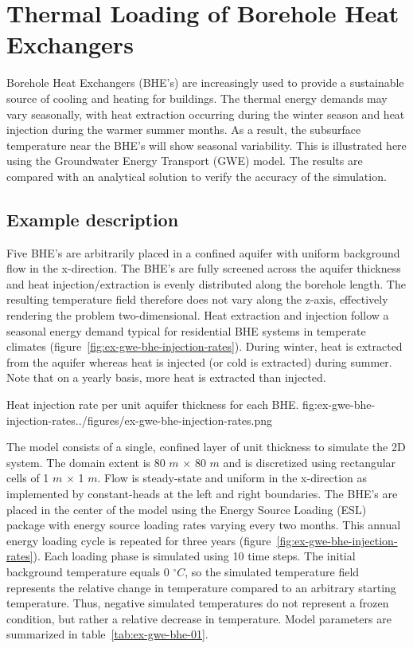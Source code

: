 \section{Thermal Loading of Borehole Heat Exchangers}

Borehole Heat Exchangers (BHE's) are increasingly used to provide a sustainable source of cooling and heating for buildings. The thermal energy demands may vary seasonally, with heat extraction occurring during the winter season and heat injection during the warmer summer months. As a result, the subsurface temperature near the BHE's will show seasonal variability. This is illustrated here using the Groundwater Energy Transport (GWE) model. The results are compared with an analytical solution to verify the accuracy of the \mf simulation. 

\subsection{Example description}

Five BHE's are arbitrarily placed in a confined aquifer with uniform background flow in the x-direction. The BHE's are fully screened across the aquifer thickness and heat injection/extraction is evenly distributed along the borehole length. The resulting temperature field therefore does not vary along the z-axis, effectively rendering the problem two-dimensional. Heat extraction and injection follow a seasonal energy demand typical for residential BHE systems in temperate climates (figure~\ref{fig:ex-gwe-bhe-injection-rates}). During winter, heat is extracted from the aquifer whereas heat is injected (or cold is extracted) during summer. Note that on a yearly basis, more heat is extracted than injected.

\begin{StandardFigure}{
    Heat injection rate per unit aquifer thickness for each BHE.
    }{fig:ex-gwe-bhe-injection-rates}{../figures/ex-gwe-bhe-injection-rates.png}
\end{StandardFigure}                                 

The \mf model consists of a single, confined layer of unit thickness to simulate the 2D system. The domain extent is 80 $m$ $\times$ 80 $m$ and is discretized using rectangular cells of 1 $m$ $\times$ 1 $m$. Flow is steady-state and uniform in the x-direction as implemented by constant-heads at the left and right boundaries. The BHE's are placed in the center of the model using the Energy Source Loading (ESL) package with energy source loading rates varying every two months. This annual energy loading cycle is repeated for three years (figure~\ref{fig:ex-gwe-bhe-injection-rates}). Each loading phase is simulated using 10 time steps. The initial background temperature equals 0 $^{\circ} C$, so the simulated temperature field represents the relative change in temperature compared to an arbitrary starting temperature. Thus, negative simulated temperatures do not represent a frozen condition, but rather a relative decrease in temperature. Model parameters are summarized in table~\ref{tab:ex-gwe-bhe-01}.

